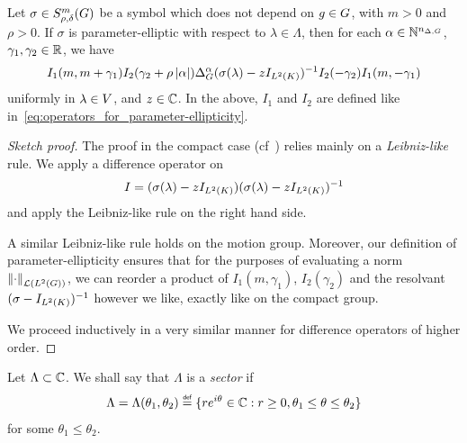 \begin{lemma}
    Let $\sigma \in \SymbolClass m {\rho, \delta}$ be a symbol which does not depend on $g \in \Group$,
    with $m > 0$ and $\rho > 0$.
    If $\sigma$ is parameter-elliptic with respect to $\lambda \in \Lambda$, then
    for each $\alpha \in \N^{\dimDifferenceOperators}$, $\gamma_1, \gamma_2 \in \R$,
    we have
    \begin{align*}
        I_1(m, m + \gamma_1)
        I_2(\gamma_2 + \rho \abs \alpha)
        \DifferenceOperatorOrder \alpha (\sigma(\lambda) - z \Id {\Lebesgue 2 \CompactGroup})^{-1}
        I_2(-\gamma_2)
        I_1(m, -\gamma_1)
    \end{align*}
    uniformly in $\lambda \in \VectorSpace$, and $z \in \C$.
    In the above, $I_1$ and $I_2$ are defined like in~\eqref{eq:operators_for_parameter-ellipticity}.
\end{lemma}
\begin{proof}[Sketch proof]
    The proof in the compact case (cf~\cite{RuzhanskyWirth14}) relies mainly on a \emph{Leibniz-like} rule.
    We apply a difference operator on
    \begin{align*}
        I = (\sigma(\lambda) - z \Id {\Lebesgue 2 \CompactGroup}) (\sigma(\lambda) - z \Id {\Lebesgue 2 \CompactGroup})^{-1}
    \end{align*}
    and apply the Leibniz-like rule on the right hand side.

    A similar Leibniz-like rule holds on the motion group.
    Moreover, our definition of parameter-ellipticity ensures that for the purposes of evaluating a norm $\norm [\Lin {\Lebesgue 2 \Group}] \dummy$,
    we can reorder a product of $I_1(m, \gamma_1)$, $I_2(\gamma_2)$ and the resolvant $(\sigma - \Id {\Lebesgue 2 \CompactGroup})^{-1}$ however we like,
    exactly like on the compact group.

    We proceed inductively in a very similar manner for difference operators of higher order.
\end{proof}

\begin{definition}[Sector]
    Let $\Lambda \subset \C$.
    We shall say that $\Lambda$ is a \emph{sector} if
    \begin{align*}
        \Lambda
        = \Lambda(\theta_1, \theta_2)
        \defeq \{r \e^{\i \theta} \in \C : r \geq 0, \theta_1 \leq \theta \leq \theta_2\}
    \end{align*}
    for some $\theta_1 \leq \theta_2$.
\end{definition}

